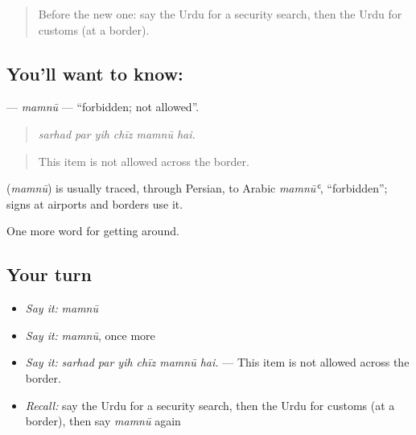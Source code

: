 \label{lesson:UR-C399-mamnu}



\begin{quote}
Before the new one: say the Urdu for a security search, then the Urdu for customs (at a border).
\end{quote}

\subsection*{You'll want to know: }
\textbf{} — \emph{mamnū} — \textquotedblleft{}forbidden; not allowed\textquotedblright{}.

\begin{quote}
     
\end{quote}

\begin{quote}
\emph{sarhad par yih chīz mamnū hai.}
\end{quote}

\begin{quote}
This item is not allowed across the border.
\end{quote}

\begin{cousinweb}
\textbf{} (\emph{mamnū}) is usually traced, through Persian, to Arabic \emph{mamnūʿ}, \textquotedblleft{}forbidden\textquotedblright{}; signs at airports and borders use it.
\end{cousinweb}

\begin{grammarlens}[title={What you've built}]
One more word for getting around.
\end{grammarlens}

\subsection*{Your turn}
\begin{itemize}
\raggedright
  \item \emph{Say it:} \emph{mamnū}
  \item \emph{Say it:} \emph{mamnū}, once more
  \item \emph{Say it:} \emph{sarhad par yih chīz mamnū hai.} — This item is not allowed across the border.
  \item \emph{Recall:} say the Urdu for a security search, then the Urdu for customs (at a border), then say \emph{mamnū} again
\end{itemize}


